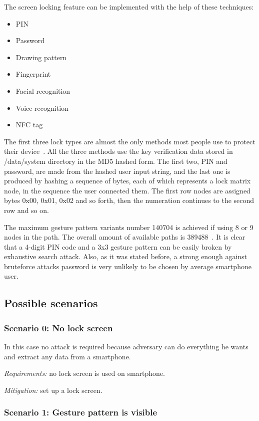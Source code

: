 The screen locking feature can be implemented with the help of these techniques:

\begin{itemize}
\item{}
PIN
\item{}
Password
\item{}
Drawing pattern
\item{}
Fingerprint
\item{}
Facial recognition
\item{}
Voice recognition
\item{}
NFC tag
\end{itemize}

The first three lock types are almost the only methods most people use to protect their device~\cite{android3}. All the three methods use the key verification data stored in /data/system directory in the MD5 hashed form. The first two, PIN and password, are made from the hashed user input string, and the last one is produced by hashing a sequence of bytes, each of which represents a lock matrix node, in the sequence the user connected them. The first row nodes are assigned bytes 0x00, 0x01, 0x02 and so forth, then the numeration continues to the second row and so on.

The maximum gesture pattern variants number 140704 is achieved if using 8 or 9 nodes in the path. The overall amount of available paths is 389488~\cite{android7}. It is clear that a 4-digit PIN code and a 3x3 gesture pattern can be easily broken by exhaustive search attack. Also, as it was stated before, a strong enough against bruteforce attacks password is very unlikely to be chosen by average smartphone user.


\subsection{Possible scenarios}

\subsubsection{Scenario 0: No lock screen}
In this case no attack is required because adversary can do everything he wants and extract any data from a smartphone.


\textsl{Requirements:} no lock screen is used on smartphone.

\textsl{Mitigation:} set up a lock screen.

\subsubsection{Scenario 1: Gesture pattern is visible}

